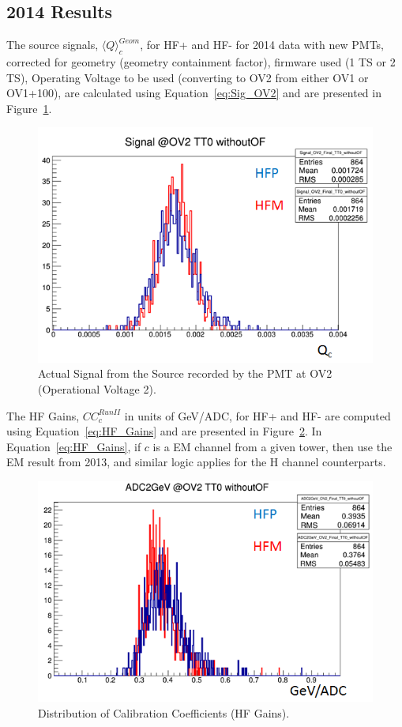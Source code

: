 \subsection{2014 Results}
The source signals, ${\langle{Q}\rangle}^{Geom}_{c}$, for HF+ and HF- for 2014 data with new PMTs, corrected for geometry (geometry containment factor), firmware used (1 TS or 2 TS), Operating Voltage to be used (converting to OV2 from either OV1 or OV1+100), are calculated using Equation~\ref{eq:Sig_OV2} and are presented in Figure~\ref{fig:Signal_@OV2_TT0_withoutOF_FORDN}.
\begin{figure}[htb]
	\begin{center}
		\includegraphics[width=.6\textwidth]{figures/ch_hfcalibration/Signal_@OV2_TT0_withoutOF_FORDN.png}
		\caption{Actual Signal from the Source recorded by the PMT at OV2 (Operational Voltage 2).}
		\label{fig:Signal_@OV2_TT0_withoutOF_FORDN}
	\end{center}
\end{figure}

The HF Gains, ${CC}^{Run II}_{c}$ in units of GeV/ADC, for HF+ and HF- are
computed using Equation~\ref{eq:HF_Gains} and are presented in Figure~\ref{fig:ADC2GeV_OV2_TT0_withoutOF_FORDN}. In Equation~\ref{eq:HF_Gains}, if $c$ is a EM channel from a given tower, then use the EM result from 2013, and similar logic applies for the H channel counterparts.
\begin{figure}[!h]
	\begin{center}
		\includegraphics[width=.6\textwidth]{figures/ch_hfcalibration/ADC2GeV_OV2_TT0_withoutOF_FORDN.png}
		\caption{Distribution of Calibration Coefficients (HF Gains).}
		\label{fig:ADC2GeV_OV2_TT0_withoutOF_FORDN}
	\end{center}
\end{figure}

